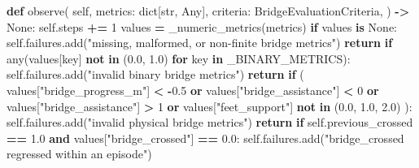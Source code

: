 \documentclass[
  chinese,
  11pt,
  letterpaper,
]{article}
\newenvironment{Shaded}{\begin{snugshade}}{\end{snugshade}}
\newcommand{\BuiltInTok}[1]{#1}
\newcommand{\ControlFlowTok}[1]{\textcolor[rgb]{0.13,0.29,0.53}{\textbf{#1}}}
\newcommand{\DecValTok}[1]{\textcolor[rgb]{0.00,0.00,0.81}{#1}}
\newcommand{\FloatTok}[1]{\textcolor[rgb]{0.00,0.00,0.81}{#1}}
\newcommand{\KeywordTok}[1]{\textcolor[rgb]{0.13,0.29,0.53}{\textbf{#1}}}
\newcommand{\NormalTok}[1]{#1}
\newcommand{\OperatorTok}[1]{\textcolor[rgb]{0.81,0.36,0.00}{\textbf{#1}}}
\newcommand{\StringTok}[1]{\textcolor[rgb]{0.31,0.60,0.02}{#1}}
\newcommand{\VariableTok}[1]{\textcolor[rgb]{0.00,0.00,0.00}{#1}}
\renewenvironment{Shaded}{\par\smallskip}{\par\smallskip}
\begin{document}
\begin{Shaded}
\begin{Highlighting}[]
    \KeywordTok{def}\NormalTok{ observe(}
        \VariableTok{self}\NormalTok{,}
\NormalTok{        metrics: }\BuiltInTok{dict}\NormalTok{[}\BuiltInTok{str}\NormalTok{, Any],}
\NormalTok{        criteria: BridgeEvaluationCriteria,}
\NormalTok{    ) }\OperatorTok{{-}\textgreater{}} \VariableTok{None}\NormalTok{:}
        \VariableTok{self}\NormalTok{.steps }\OperatorTok{+=} \DecValTok{1}
\NormalTok{        values }\OperatorTok{=}\NormalTok{ \_numeric\_metrics(metrics)}
        \ControlFlowTok{if}\NormalTok{ values }\KeywordTok{is} \VariableTok{None}\NormalTok{:}
            \VariableTok{self}\NormalTok{.failures.add(}\StringTok{"missing, malformed, or non{-}finite bridge metrics"}\NormalTok{)}
            \ControlFlowTok{return}
        \ControlFlowTok{if} \BuiltInTok{any}\NormalTok{(values[key] }\KeywordTok{not} \KeywordTok{in}\NormalTok{ (}\FloatTok{0.0}\NormalTok{, }\FloatTok{1.0}\NormalTok{) }\ControlFlowTok{for}\NormalTok{ key }\KeywordTok{in}\NormalTok{ \_BINARY\_METRICS):}
            \VariableTok{self}\NormalTok{.failures.add(}\StringTok{"invalid binary bridge metrics"}\NormalTok{)}
            \ControlFlowTok{return}
        \ControlFlowTok{if}\NormalTok{ (}
\NormalTok{            values[}\StringTok{"bridge\_progress\_m"}\NormalTok{] }\OperatorTok{\textless{}} \OperatorTok{{-}}\FloatTok{0.5}
            \KeywordTok{or}\NormalTok{ values[}\StringTok{"bridge\_assistance"}\NormalTok{] }\OperatorTok{\textless{}} \DecValTok{0}
            \KeywordTok{or}\NormalTok{ values[}\StringTok{"bridge\_assistance"}\NormalTok{] }\OperatorTok{\textgreater{}} \DecValTok{1}
            \KeywordTok{or}\NormalTok{ values[}\StringTok{"feet\_support"}\NormalTok{] }\KeywordTok{not} \KeywordTok{in}\NormalTok{ (}\FloatTok{0.0}\NormalTok{, }\FloatTok{1.0}\NormalTok{, }\FloatTok{2.0}\NormalTok{)}
\NormalTok{        ):}
            \VariableTok{self}\NormalTok{.failures.add(}\StringTok{"invalid physical bridge metrics"}\NormalTok{)}
            \ControlFlowTok{return}
        \ControlFlowTok{if} \VariableTok{self}\NormalTok{.previous\_crossed }\OperatorTok{==} \FloatTok{1.0} \KeywordTok{and}\NormalTok{ values[}\StringTok{"bridge\_crossed"}\NormalTok{] }\OperatorTok{==} \FloatTok{0.0}\NormalTok{:}
            \VariableTok{self}\NormalTok{.failures.add(}\StringTok{"bridge\_crossed regressed within an episode"}\NormalTok{)}


\end{Highlighting}
\end{Shaded}
\end{document}
